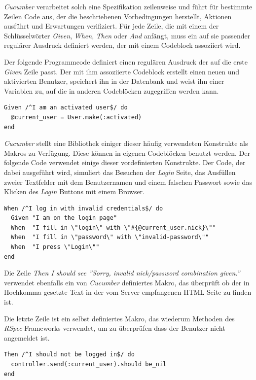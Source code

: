 \textit{Cucumber} verarbeitet solch eine Spezifikation zeilenweise und führt
für bestimmte Zeilen Code aus, der die beschriebenen Vorbedingungen
herstellt, Aktionen ausführt und Erwartungen verifiziert. Für jede
Zeile, die mit einem der Schlüsselwörter \textit{Given},
\textit{When}, \textit{Then} oder \textit{And} anfängt, muss ein auf
sie passender regulärer Ausdruck definiert werden, der mit einem
Codeblock assoziiert wird.

Der folgende Programmcode definiert einen regulären Ausdruck der auf
die erste \textit{Given} Zeile passt. Der mit ihm assoziierte Codeblock
erstellt einen neuen und aktivierten Benutzer, speichert ihn in der
Datenbank und weist ihn einer Variablen zu, auf die in anderen
Codeblöcken zugegriffen werden kann.

\begin{lstlisting}
Given /^I am an activated user$/ do
  @current_user = User.make(:activated)
end
\end{lstlisting}

\textit{Cucumber} stellt eine Bibliothek einiger dieser häufig verwendeten
Konstrukte als Makros zu Verfügung. Diese können in eigenen
Codeblöcken benutzt werden. Der folgende Code verwendet einige dieser
vordefinierten Konstrukte. Der Code, der dabei ausgeführt wird,
simuliert das Besuchen der \textit{Login} Seite, das Ausfüllen zweier
Textfelder mit dem Benutzernamen und einem falschen Passwort sowie das
Klicken des \textit{Login} Buttons mit einem Browser.

\begin{lstlisting}
When /^I log in with invalid credentials$/ do
  Given "I am on the login page"
  When  "I fill in \"login\" with \"#{@current_user.nick}\""
  When  "I fill in \"password\" with \"invalid-password\""
  When  "I press \"Login\""
end
\end{lstlisting}

Die Zeile \textit{Then I should see ''Sorry, invalid nick/password
  combination given.''} verwendet ebenfalls ein von \textit{Cucumber}
definiertes Makro, das überprüft ob der in Hochkomma gesetzte Text in
der vom Server empfangenen HTML Seite zu finden ist.

Die letzte Zeile ist ein selbst definiertes Makro, das wiederum
Methoden des \textit{RSpec} Frameworks verwendet, um zu überprüfen dass der
Benutzer nicht angemeldet ist.

\begin{lstlisting}
Then /^I should not be logged in$/ do
  controller.send(:current_user).should be_nil
end
\end{lstlisting}

